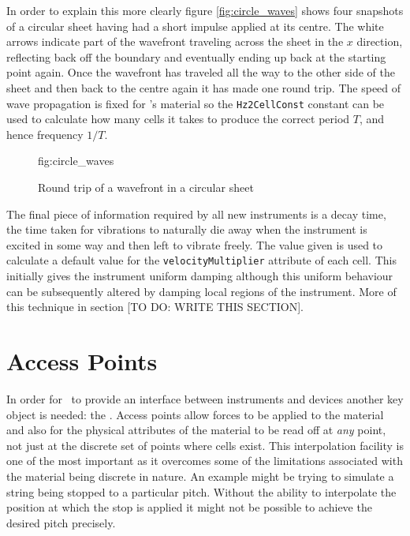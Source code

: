 In order to explain this more clearly figure \ref{fig:circle_waves}
shows four snapshots of a circular sheet having had a short impulse
applied at its centre. The white arrows
indicate part of the wavefront traveling across the sheet in the 
$x$ direction, reflecting back off the boundary and eventually
ending up back at the starting point again. Once the wavefront has
traveled all the way to the other side of the sheet and then back
to the centre again it has made one round trip. The speed of wave
propagation is fixed for \tao's material so the \verb|Hz2CellConst|
constant can be used to calculate how many cells it takes to produce
the correct period $T$, and hence frequency $1/T$.

\begin{figure}[htb]
  \begin{Label}{fig:circle_waves}
    \begin{center}
    \end{center}
    \caption{Round trip of a wavefront in a circular sheet}
  \end{Label}
\end{figure}


The final piece of information required by all new instruments is a
decay time, the time taken for vibrations to naturally die away
when the instrument is excited in some way and then left to vibrate
freely. The value given is used to calculate a default value
for the \verb|velocityMultiplier| attribute of each cell. This initially
gives the instrument uniform damping although this uniform behaviour
can be subsequently altered by damping local regions of the instrument.
More of this technique in section [TO DO: WRITE THIS SECTION].

\section{Access Points}
\label{section:access_points}
In order for \tao\ to provide an interface between instruments and devices
another key object is needed: the . Access points
allow forces to be applied to the material and also for the physical
attributes of the material to be read off at \emph{any}\/ point, not just
at the discrete set of points where cells exist. This interpolation facility
is one of the most important as it overcomes some of the limitations associated
with the material being discrete in nature. An example might be trying to
simulate a string being stopped to a particular pitch. Without the ability
to interpolate the position at which the stop is applied it might not be
possible to achieve the desired pitch precisely.

